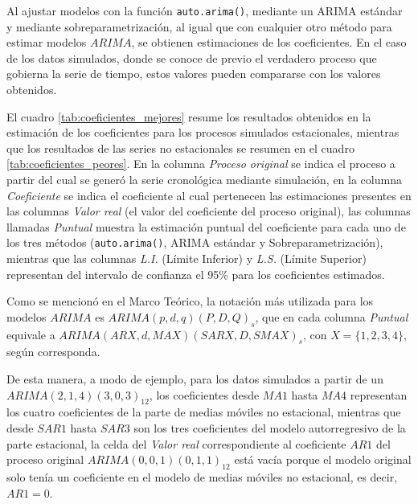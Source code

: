\documentclass[
]{article}
\begin{document}
Al ajustar modelos con la función \texttt{auto.arima()}, mediante un
ARIMA estándar y mediante sobreparametrización, al igual que con
cualquier otro método para estimar modelos \(ARIMA\), se obtienen
estimaciones de los coeficientes. En el caso de los datos simulados,
donde se conoce de previo el verdadero proceso que gobierna la serie de
tiempo, estos valores pueden compararse con los valores obtenidos.

El cuadro \ref{tab:coeficientes_mejores} resume los resultados obtenidos
en la estimación de los coeficientes para los procesos simulados
estacionales, mientras que los resultados de las series no estacionales
se resumen en el cuadro \ref{tab:coeficientes_peores}. En la columna
\emph{Proceso original} se indica el proceso a partir del cual se generó
la serie cronológica mediante simulación, en la columna
\emph{Coeficiente} se indica el coeficiente al cual pertenecen las
estimaciones presentes en las columnas \emph{Valor real} (el valor del
coeficiente del proceso original), las columnas llamadas \emph{Puntual}
muestra la estimación puntual del coeficiente para cada uno de los tres
métodos (\texttt{auto.arima()}, ARIMA estándar y Sobreparametrización),
mientras que las columnas \emph{L.I.} (Límite Inferior) y \emph{L.S.}
(Límite Superior) representan del intervalo de confianza el 95\% para
los coeficientes estimados.

Como se mencionó en el Marco Teórico, la notación más utilizada para los
modelos \(ARIMA\) es \(ARIMA(p,d,q)(P,D,Q)_s\), que en cada columna
\emph{Puntual} equivale a \(ARIMA(ARX, d, MAX)(SARX, D, SMAX)_s\), con
\(X=\{1,2,3,4\}\), según corresponda.

De esta manera, a modo de ejemplo, para los datos simulados a partir de
un \(ARIMA(2,1,4)(3,0,3)_{12}\), los coeficientes desde \(MA1\) hasta
\(MA4\) representan los cuatro coeficientes de la parte de medias
móviles no estacional, mientras que desde \(SAR1\) hasta \(SAR3\) son
los tres coeficientes del modelo autorregresivo de la parte estacional,
la celda del \emph{Valor real} correspondiente al coeficiente \(AR1\)
del proceso original \(ARIMA(0,0,1)(0,1,1)_{12}\) está vacía porque el
modelo original solo tenía un coeficiente en el modelo de medias móviles
no estacional, es decir, \(AR1=0\).
\end{document}
